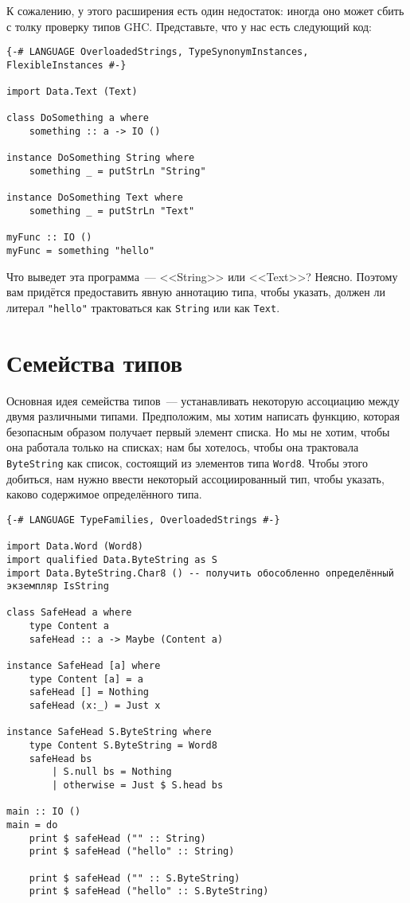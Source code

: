 К сожалению, у этого расширения есть один недостаток: иногда оно может сбить с толку проверку типов GHC. Представьте, что у нас есть следующий код:

\begin{lstlisting}
{-# LANGUAGE OverloadedStrings, TypeSynonymInstances, FlexibleInstances #-}

import Data.Text (Text)

class DoSomething a where
    something :: a -> IO ()

instance DoSomething String where
    something _ = putStrLn "String"

instance DoSomething Text where
    something _ = putStrLn "Text"

myFunc :: IO ()
myFunc = something "hello"
\end{lstlisting}

Что выведет эта программа~--- <<String>> или <<Text>>? Неясно. Поэтому вам придётся предоставить явную аннотацию типа, чтобы указать, должен ли литерал \lstinline'"hello"' трактоваться как \lstinline'String' или как \lstinline'Text'.

\section{Семейства типов}

Основная идея семейства типов~--- устанавливать некоторую ассоциацию между двумя различными типами. Предположим, мы хотим написать функцию, которая безопасным образом получает первый элемент списка. Но мы не хотим, чтобы она работала только на списках; нам бы хотелось, чтобы она трактовала \lstinline'ByteString' как список, состоящий из элементов типа \lstinline'Word8'. Чтобы этого добиться, нам нужно ввести некоторый ассоциированный тип, чтобы указать, каково содержимое определённого типа.

\begin{lstlisting}
{-# LANGUAGE TypeFamilies, OverloadedStrings #-}

import Data.Word (Word8)
import qualified Data.ByteString as S
import Data.ByteString.Char8 () -- получить обособленно определённый экземпляр IsString

class SafeHead a where
    type Content a
    safeHead :: a -> Maybe (Content a)

instance SafeHead [a] where
    type Content [a] = a
    safeHead [] = Nothing
    safeHead (x:_) = Just x

instance SafeHead S.ByteString where
    type Content S.ByteString = Word8
    safeHead bs
        | S.null bs = Nothing
        | otherwise = Just $ S.head bs

main :: IO ()
main = do
    print $ safeHead ("" :: String)
    print $ safeHead ("hello" :: String)

    print $ safeHead ("" :: S.ByteString)
    print $ safeHead ("hello" :: S.ByteString)
\end{lstlisting}

